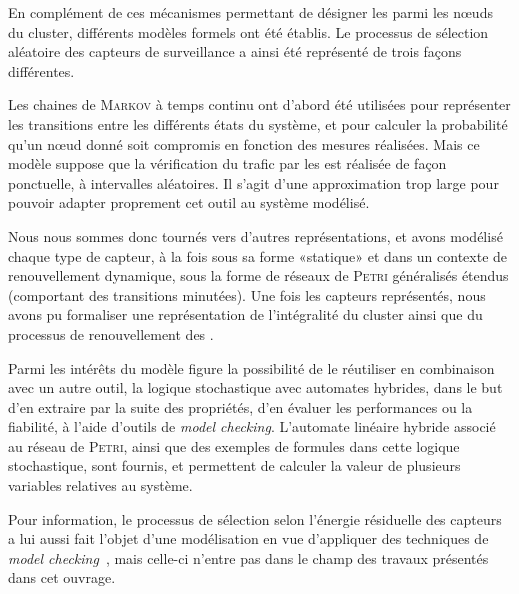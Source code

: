 En complément de ces mécanismes permettant de désigner les \cnst parmi les nœuds du cluster, différents modèles formels ont été établis.
Le processus de sélection aléatoire des capteurs de surveillance a ainsi été représenté de trois façons différentes.

Les chaines de \textsc{Markov} à temps continu ont d'abord été utilisées pour représenter les transitions entre les différents états du système, et pour calculer la probabilité qu'un nœud donné soit compromis en fonction des mesures réalisées.
Mais ce modèle suppose que la vérification du trafic par les \cnst est réalisée de façon ponctuelle, à intervalles aléatoires.
Il s'agit d'une approximation trop large pour pouvoir adapter proprement cet outil au système modélisé.

Nous nous sommes donc tournés vers d'autres représentations, et avons modélisé chaque type de capteur, à la fois sous sa forme «statique» et dans un contexte de renouvellement dynamique, sous la forme de réseaux de \textsc{Petri} généralisés étendus (comportant des transitions minutées).
Une fois les capteurs représentés, nous avons pu formaliser une représentation de l'intégralité du cluster ainsi que du processus de renouvellement des \cnst.

Parmi les intérêts du modèle figure la possibilité de le réutiliser en combinaison avec un autre outil, la logique stochastique avec automates hybrides, dans le but d'en extraire par la suite des propriétés, d'en évaluer les performances ou la fiabilité, à l'aide d'outils de \textit{model checking}.
L'automate linéaire hybride associé au réseau de \textsc{Petri}, ainsi que des exemples de formules dans cette logique stochastique, sont fournis, et permettent de calculer la valeur de plusieurs variables relatives au système.

Pour information, le processus de sélection selon l'énergie résiduelle des capteurs a lui aussi fait l'objet d'une modélisation en vue d'appliquer des techniques de \textit{model checking}~\cite{HMMBA14}, mais celle-ci n'entre pas dans le champ des travaux présentés dans cet ouvrage.

